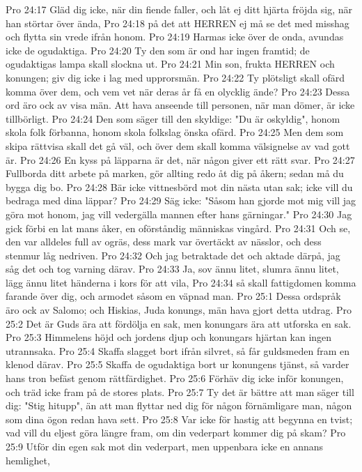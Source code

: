 Pro 24:17  Gläd dig icke, när din fiende faller, och låt ej ditt hjärta fröjda sig, när han störtar över ända,
Pro 24:18  på det att HERREN ej må se det med misshag och flytta sin vrede ifrån honom.
Pro 24:19  Harmas icke över de onda, avundas icke de ogudaktiga.
Pro 24:20  Ty den som är ond har ingen framtid; de ogudaktigas lampa skall slockna ut.
Pro 24:21  Min son, frukta HERREN och konungen; giv dig icke i lag med upprorsmän.
Pro 24:22  Ty plötsligt skall ofärd komma över dem, och vem vet när deras år få en olycklig ände?
Pro 24:23  Dessa ord äro ock av visa män. Att hava anseende till personen, när man dömer, är icke tillbörligt.
Pro 24:24  Den som säger till den skyldige: "Du är oskyldig", honom skola folk förbanna, honom skola folkslag önska ofärd.
Pro 24:25  Men dem som skipa rättvisa skall det gå väl, och över dem skall komma välsignelse av vad gott är.
Pro 24:26  En kyss på läpparna är det, när någon giver ett rätt svar.
Pro 24:27  Fullborda ditt arbete på marken, gör allting redo åt dig på åkern; sedan må du bygga dig bo.
Pro 24:28  Bär icke vittnesbörd mot din nästa utan sak; icke vill du bedraga med dina läppar?
Pro 24:29  Säg icke: "Såsom han gjorde mot mig vill jag göra mot honom, jag vill vedergälla mannen efter hans gärningar."
Pro 24:30  Jag gick förbi en lat mans åker, en oförståndig människas vingård.
Pro 24:31  Och se, den var alldeles full av ogräs, dess mark var övertäckt av nässlor, och dess stenmur låg nedriven.
Pro 24:32  Och jag betraktade det och aktade därpå, jag såg det och tog varning därav.
Pro 24:33  Ja, sov ännu litet, slumra ännu litet, lägg ännu litet händerna i kors för att vila,
Pro 24:34  så skall fattigdomen komma farande över dig, och armodet såsom en väpnad man.
Pro 25:1  Dessa ordspråk äro ock av Salomo; och Hiskias, Juda konungs, män hava gjort detta utdrag.
Pro 25:2  Det är Guds ära att fördölja en sak, men konungars ära att utforska en sak.
Pro 25:3  Himmelens höjd och jordens djup och konungars hjärtan kan ingen utrannsaka.
Pro 25:4  Skaffa slagget bort ifrån silvret, så får guldsmeden fram en klenod därav.
Pro 25:5  Skaffa de ogudaktiga bort ur konungens tjänst, så varder hans tron befäst genom rättfärdighet.
Pro 25:6  Förhäv dig icke inför konungen, och träd icke fram på de stores plats.
Pro 25:7  Ty det är bättre att man säger till dig: "Stig hitupp", än att man flyttar ned dig för någon förnämligare man, någon som dina ögon redan hava sett.
Pro 25:8  Var icke för hastig att begynna en tvist; vad vill du eljest göra längre fram, om din vederpart kommer dig på skam?
Pro 25:9  Utför din egen sak mot din vederpart, men uppenbara icke en annans hemlighet,
